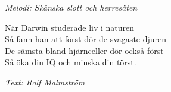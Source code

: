 {\footnotesize\textit{Melodi: Skånska slott och herresäten}}\par
\vspace{10pt}
När Darwin studerade liv i naturen\\
Så fann han att först dör de svagaste djuren\\
De sämsta bland hjärnceller dör också först\\
Så öka din IQ och minska din törst.\par
\vspace{10pt}
{\footnotesize\textit{Text: Rolf Malmström}}
